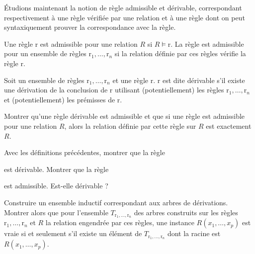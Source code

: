 \'Etudions maintenant la notion de règle admissible et dérivable, correspondant
respectivement à une règle vérifiée par une relation et à une règle dont on peut
syntaxiquement prouver la correspondance avec la règle.

\begin{definition}
  Une règle $\mathrm r$ est admissible pour une relation $R$ si
  $R\models \mathrm r$. La règle est admissible pour un ensemble de règles
  $\mathrm r_1,\ldots,\mathrm r_n$ si la relation définie par ces règles vérifie
  la règle $\mathrm r$.
\end{definition}

\begin{definition}
  Soit un ensemble de règles $\mathrm r_1,\ldots,\mathrm r_n$ et une règle
  $\mathrm r$. $\mathrm r$ est dite dérivable s'il existe une dérivation de la
  conclusion de $\mathrm r$ utilisant (potentiellement) les règles
  $\mathrm r_1,\ldots,\mathrm r_n$ et (potentiellement) les prémisses de
  $\mathrm r$.
\end{definition}

\begin{exercise}
  Montrer qu'une règle dérivable est admissible et que si une règle est
  admissible pour une relation $R$, alors la relation définie par cette règle
  sur $R$ est exactement $R$.
\end{exercise}

\begin{exercise}\label{exo:pair_list}
  Avec les définitions précédentes, montrer que la règle
  \begin{prooftree}
  \end{prooftree}
  est dérivable. Montrer que la règle
  \begin{prooftree}
  \end{prooftree}
  est admissible. Est-elle dérivable ?
\end{exercise}

\begin{exercise}
  Construire un ensemble inductif correspondant aux arbres de dérivations.
  Montrer alors que pour l'ensemble $T_{\mathrm r_1,\ldots,\mathrm r_n}$
  des arbres construits sur les règles $\mathrm r_1,\ldots,\mathrm r_n$ et
  $R$ la relation engendrée par ces règles, une instance $R(x_1,\ldots,x_p)$
  est vraie si et seulement s'il existe un élément de
  $T_{\mathrm r_1,\ldots,\mathrm r_n}$ dont la racine est $R(x_1,\ldots,x_p)$.
\end{exercise}

